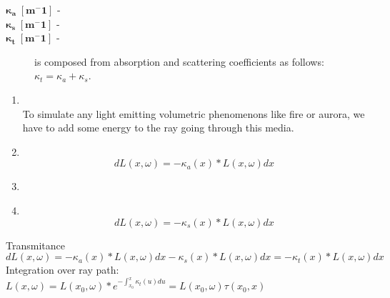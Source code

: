\begin{description}
\item[$\boldsymbol{\kappa_{a}\; [m^-1]}$ - ] 

\item[$\boldsymbol{\kappa_{s}\; [m^-1]}$ - ] 

\item[$\boldsymbol{\kappa_{t}\; [m^-1]}$ - ]

is composed from absorption and scattering coefficients as follows: $\kappa_{t}=\kappa_{a}+\kappa_{s}$.

\end{description}
 \begin{enumerate}
\item {}\\
To simulate any light emitting volumetric phenomenons like fire or aurora, we have to add some energy to the ray going through this media.
\item {}\\

\begin{equation}
 	dL(x,\omega)=-\kappa_a(x)*L(x,\omega)dx
 \end{equation}
 
 
\item {}\\


\item {}\\
\begin{equation}
	dL(x,\omega)=-\kappa_s(x)*L(x,\omega)dx 
\end{equation}
\end{enumerate}
Transmitance
$dL(x,\omega)=-\kappa_a(x)*L(x,\omega)dx-\kappa_s(x)*L(x,\omega)dx =-\kappa_t(x)*L(x,\omega)dx$
Integration over ray path:
$L(x,\omega)=L(x_0,\omega)*e^{-\int_{x_{0}}^{x}\kappa_t(u)du}=L(x_0,\omega)\tau(x_0,x)$




